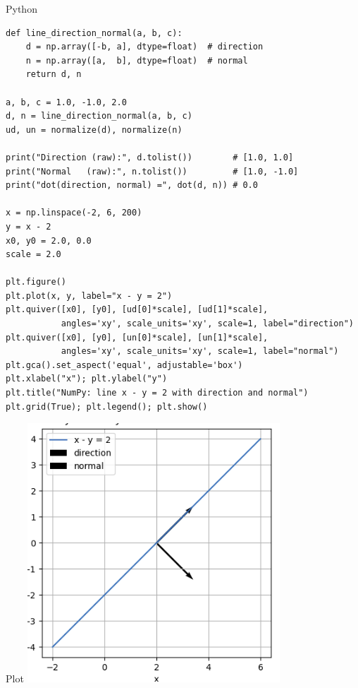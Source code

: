 \documentclass{beamer}
\begin{document}
\begin{frame}[fragile]{Python}
\begin{lstlisting}
def line_direction_normal(a, b, c):
    d = np.array([-b, a], dtype=float)  # direction
    n = np.array([a,  b], dtype=float)  # normal
    return d, n

a, b, c = 1.0, -1.0, 2.0
d, n = line_direction_normal(a, b, c)
ud, un = normalize(d), normalize(n)

print("Direction (raw):", d.tolist())        # [1.0, 1.0]
print("Normal   (raw):", n.tolist())         # [1.0, -1.0]
print("dot(direction, normal) =", dot(d, n)) # 0.0

x = np.linspace(-2, 6, 200)
y = x - 2
x0, y0 = 2.0, 0.0
scale = 2.0

plt.figure()
plt.plot(x, y, label="x - y = 2")
plt.quiver([x0], [y0], [ud[0]*scale], [ud[1]*scale],
           angles='xy', scale_units='xy', scale=1, label="direction")
plt.quiver([x0], [y0], [un[0]*scale], [un[1]*scale],
           angles='xy', scale_units='xy', scale=1, label="normal")
plt.gca().set_aspect('equal', adjustable='box')
plt.xlabel("x"); plt.ylabel("y")
plt.title("NumPy: line x - y = 2 with direction and normal")
plt.grid(True); plt.legend(); plt.show()
\end{lstlisting}
\end{frame}

\begin{frame}{Plot}
    \centering
    \includegraphics[width=\columnwidth, height=0.8\textheight, keepaspectratio]{figs/mg4plot.png}
\end{frame}
\end{document}
